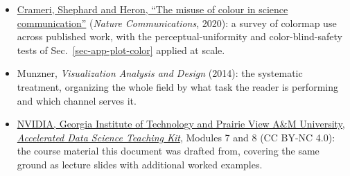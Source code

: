 \begin{itemize}
	\item \href{https://doi.org/10.1038/s41467-020-19160-7}{Crameri, Shephard and Heron, ``The misuse of colour in science communication''} (\emph{Nature Communications}, 2020): a survey of colormap use across published work, with the perceptual-uniformity and color-blind-safety tests of Sec.~\ref{sec-app-plot-color} applied at scale.
	\item Munzner, \emph{Visualization Analysis and Design} (2014): the systematic treatment, organizing the whole field by what task the reader is performing and which channel serves it.
	\item \href{https://www.nvidia.com/en-us/training/teaching-kits/}{NVIDIA, Georgia Institute of Technology and Prairie View A\&M University, \emph{Accelerated Data Science Teaching Kit}}, Modules 7 and 8 (CC BY-NC 4.0): the course material this document was drafted from, covering the same ground as lecture slides with additional worked examples.
\end{itemize}
